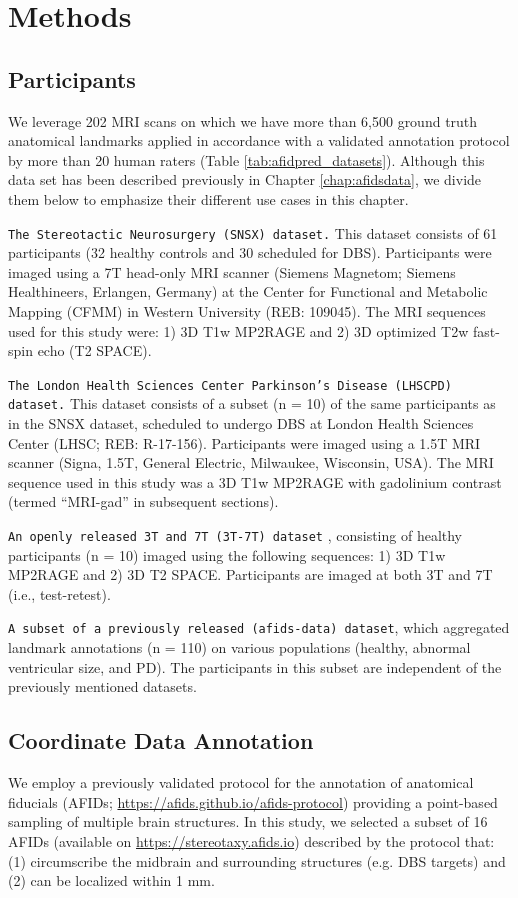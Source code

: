 \section{Methods}

\subsection{Participants}
We leverage 202 MRI scans on which we have more than 6,500 ground truth anatomical landmarks applied in accordance with a validated annotation protocol \cite{Lau2019-eh} by more than 20 human raters (Table \ref{tab:afidpred_datasets}). Although this data set has been described previously in Chapter \ref{chap:afidsdata}, we divide them below to emphasize their different use cases in this chapter. 

\texttt{The Stereotactic Neurosurgery (SNSX) dataset.} This dataset consists of 61 participants (32 healthy controls and 30 scheduled for DBS). Participants were imaged using a 7T head-only MRI scanner (Siemens Magnetom; Siemens Healthineers, Erlangen, Germany) at the Center for Functional and Metabolic Mapping (CFMM) in Western University (REB: 109045). The MRI sequences used for this study were: 1) 3D T1w MP2RAGE and 2) 3D optimized T2w fast-spin echo (T2 SPACE).

\texttt{The London Health Sciences Center Parkinson’s Disease (LHSCPD) dataset.} This dataset consists of a subset (n = 10) of the same participants as in the SNSX dataset, scheduled to undergo DBS at London Health Sciences Center (LHSC; REB: R-17-156). Participants were imaged using a 1.5T MRI scanner (Signa, 1.5T, General Electric, Milwaukee, Wisconsin, USA). The MRI sequence used in this study was a 3D T1w MP2RAGE with gadolinium contrast (termed “MRI-gad” in subsequent sections).

\texttt{An openly released 3T and 7T (3T-7T) dataset} \cite{Chen2023-cn}, consisting of healthy participants (n = 10) imaged using the following sequences: 1) 3D T1w MP2RAGE and 2) 3D T2 SPACE. Participants are imaged at both 3T and 7T (i.e., test-retest).

\texttt{A subset of a previously released (afids-data) dataset}, which aggregated landmark annotations (n = 110) on various populations (healthy, abnormal ventricular size, and PD). The participants in this subset are independent of the previously mentioned datasets.

\subsection{Coordinate Data Annotation}
We employ a previously validated protocol for the annotation of anatomical fiducials (AFIDs; \url{https://afids.github.io/afids-protocol}) providing a point-based sampling of multiple brain structures. In this study, we selected a subset of 16 AFIDs (available on \url{https://stereotaxy.afids.io}) described by the protocol that: (1) circumscribe the midbrain and surrounding structures (e.g. DBS targets) and (2) can be localized within 1 mm.

